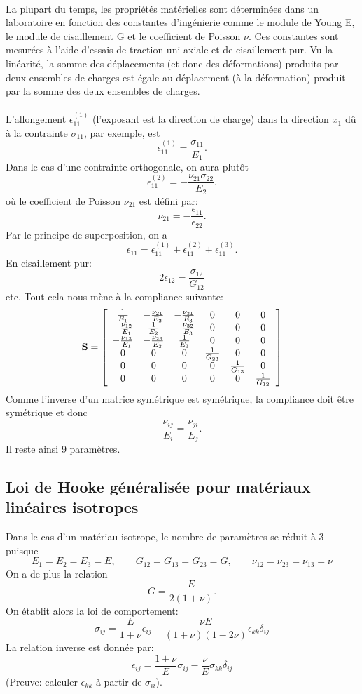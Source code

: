 \paragraph{}
La plupart du temps, les propriétés matérielles sont déterminées dans un laboratoire en fonction des constantes d'ingénierie comme le module de Young E, le module de cisaillement G et le coefficient de Poisson $\nu$. Ces constantes sont mesurées à l'aide d'essais de traction uni-axiale et de cisaillement pur. Vu la linéarité, la somme des déplacements (et donc des déformations) produits par deux ensembles de charges est égale au déplacement (à la déformation) produit par la somme des deux ensembles de charges.
\paragraph{}
L'allongement $\epsilon_{11}^{(1)}$ (l'exposant est la direction de charge) dans la direction $x_1$ dû à la contrainte $\sigma_{11}$, par exemple, est $$\epsilon_{11}^{(1)}=\frac{\sigma_{11}}{E_1}.$$ Dans le cas d'une contrainte orthogonale, on aura plutôt
$$\epsilon_{11}^{(2)}=-\frac{\nu_{21}\sigma_{22}}{E_2}.$$ où le coefficient de Poisson $\nu_{21}$ est défini par:
$$\nu_{21}=-\frac{\epsilon_{11}}{\epsilon_{22}}.$$ Par le principe de superposition, on a
$$\epsilon_{11}=\epsilon_{11}^{(1)}+\epsilon_{11}^{(2)}+\epsilon_{11}^{(3)}.$$
En cisaillement pur:
$$2\epsilon_{12}=\frac{\sigma_{12}}{G_{12}}$$ etc.
Tout cela nous mène à la compliance suivante:
$$\textbf{S}=
\left[
\begin{array}{cccccc}
\frac{1}{E_1}&-\frac{\nu_{21}}{E_2}&-\frac{\nu_{31}}{E_3}&0&0&0\\
-\frac{\nu_{12}}{E_1}&\frac{1}{E_2}&-\frac{\nu_{32}}{E_3}&0&0&0\\
-\frac{\nu_{13}}{E_1}&-\frac{\nu_{23}}{E_2}&\frac{1}{E_3}&0&0&0\\
0&0&0&\frac{1}{G_{23}}&0&0\\
0&0&0&0&\frac{1}{G_{13}}&0\\
0&0&0&0&0&\frac{1}{G_{12}}\\
\end{array}\right]$$
Comme l'inverse d'un matrice symétrique est symétrique, la compliance doit être symétrique et donc $$\frac{\nu_{ij}}{E_i}=\frac{\nu_{ji}}{E_j}.$$ Il reste ainsi 9 paramètres.

\subsection{Loi de Hooke généralisée pour matériaux linéaires isotropes}
Dans le cas d'un matériau isotrope, le nombre de paramètres se réduit à 3 puisque
$$E_1=E_2=E_3=E,\qquad G_{12}=G_{13}=G_{23}=G,\qquad \nu_{12}=\nu_{23}=\nu_{13}=\nu$$ On a de plus la relation $$G=\frac{E}{2(1+\nu)}.$$
On établit alors la loi de comportement:
$$\boxed{\sigma_{ij}=\frac{E}{1+\nu}\epsilon_{ij}+\frac{\nu E}{(1+\nu)(1-2\nu)}\epsilon_{kk}\delta_{ij}}$$
La relation inverse est donnée par:
$$\boxed{\epsilon_{ij}=\frac{1+\nu}{E}\sigma_{ij}-\frac{\nu}{E}\sigma_{kk}\delta_{ij}}$$
(Preuve: calculer $\epsilon_{kk}$ à partir de $\sigma_{ii}$).
